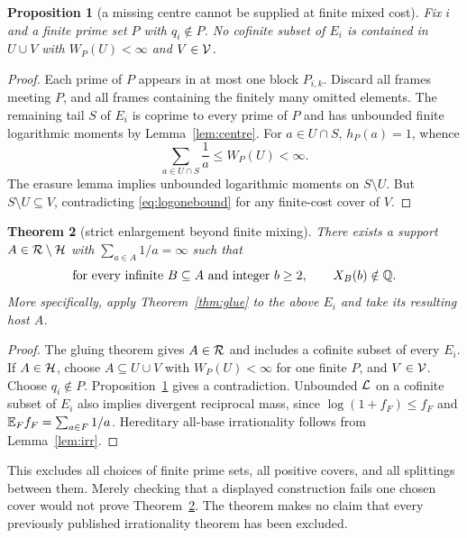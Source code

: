 \documentclass[11pt,a4paper]{article}
\newtheorem{theorem}{Theorem}[section]
\newtheorem{proposition}[theorem]{Proposition}
\theoremstyle{definition}\newtheorem{definition}[theorem]{Definition}
\theoremstyle{remark}\newtheorem{remark}[theorem]{Remark}
\begin{document}
\begin{proposition}[a missing centre cannot be supplied at finite mixed cost]\label{prop:missing}
Fix $i$ and a finite prime set $P$ with $q_i\notin P$. No cofinite subset of $E_i$ is contained in $U\cup V$ with $W_P(U)<\infty$ and $V\in\mathcal V$.
\end{proposition}
\begin{proof}
Each prime of $P$ appears in at most one block $P_{i,k}$. Discard all frames meeting $P$, and all frames containing the finitely many omitted elements. The remaining tail $S$ of $E_i$ is coprime to every prime of $P$ and has unbounded finite logarithmic moments by Lemma~\ref{lem:centre}.
For $a\in U\cap S$, $h_P(a)=1$, whence
\[
 \sum_{a\in U\cap S}\frac1a\le W_P(U)<\infty.
\]
The erasure lemma implies unbounded logarithmic moments on $S\setminus U$.
But $S\setminus U\subseteq V$, contradicting \eqref{eq:logonebound} for any finite-cost cover of $V$.
\end{proof}

\begin{theorem}[strict enlargement beyond finite mixing]\label{thm:strict}
There exists a support $A\in\mathcal R\setminus\mathcal H$ with $\sum_{a\in A}1/a=\infty$ such that
\[
 \text{for every infinite }B\subseteq A\text{ and integer }b\ge2,
 \qquad X_B(b)\notin\mathbb Q.
\]
More specifically, apply Theorem~\ref{thm:glue} to the above $E_i$ and take its resulting host $A$.
\end{theorem}
\begin{proof}
The gluing theorem gives $A\in\mathcal R$ and includes a cofinite subset of every $E_i$.
If $A\in\mathcal H$, choose $A\subseteq U\cup V$ with $W_P(U)<\infty$ for one finite $P$, and $V\in\mathcal V$.
Choose $q_i\notin P$. Proposition~\ref{prop:missing} gives a contradiction.
Unbounded $\mathcal L$ on a cofinite subset of $E_i$ also implies divergent reciprocal mass, since $\log(1+f_F)\le f_F$ and $\mathbb E_Ff_F=\sum_{a\in F}1/a$.
Hereditary all-base irrationality follows from Lemma~\ref{lem:irr}.
\end{proof}

This excludes all choices of finite prime sets, all positive covers, and all splittings between them. Merely checking that a displayed construction fails one chosen cover would not prove Theorem~\ref{thm:strict}. The theorem makes no claim that every previously published irrationality theorem has been excluded.
\end{document}
